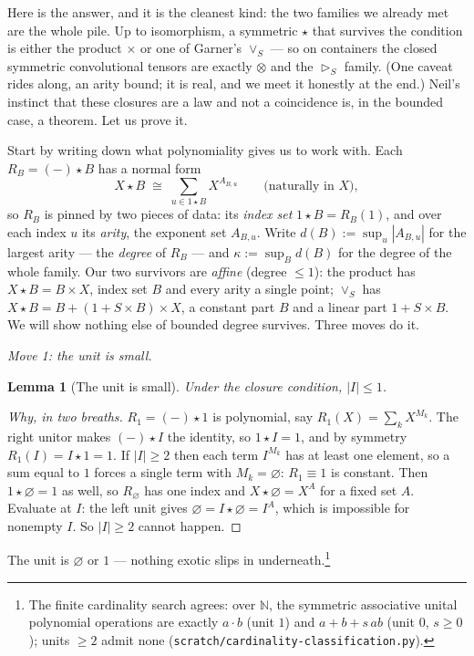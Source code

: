 \documentclass[11pt,a4paper]{book}
\theoremstyle{plain}
\newtheorem{Lemma}[Theorem]{Lemma}
\theoremstyle{definition}
\theoremstyle{remark}
\begin{document}
Here is the answer, and it is the cleanest kind: the two families we already met are
the whole pile. Up to isomorphism, a symmetric $\star$ that survives the condition is
either the product $\times$ or one of Garner's $\vee_S$ --- so on containers the
closed symmetric convolutional tensors are exactly $\otimes$ and the $\rhd_S$ family.
(One caveat rides along, an arity bound; it is real, and we meet it honestly at the
end.) Neil's instinct that these closures are a law and not a coincidence is, in the
bounded case, a theorem. Let us prove it.

Start by writing down what polynomiality gives us to work with. Each $R_B=(-)\star B$
has a normal form
\[
   X\star B\;\cong\;\sum_{u\in 1\star B} X^{A_{B,u}}\qquad\text{(naturally in $X$)},
\]
so $R_B$ is pinned by two pieces of data: its \emph{index set} $1\star B=R_B(1)$, and
over each index $u$ its \emph{arity}, the exponent set $A_{B,u}$. Write
$d(B):=\sup_u|A_{B,u}|$ for the largest arity --- the \emph{degree} of $R_B$ --- and
$\kappa:=\sup_B d(B)$ for the degree of the whole family. Our two survivors are
\emph{affine} (degree $\le 1$): the product has $X\star B=B\times X$, index set $B$
and every arity a single point; $\vee_S$ has $X\star B=B+(1+S\times B)\times X$, a
constant part $B$ and a linear part $1+S\times B$. We will show nothing else of
bounded degree survives. Three moves do it.

\medskip\noindent\emph{Move 1: the unit is small.}

\begin{Lemma}[The unit is small]\label{lem:unitsmall}
Under the closure condition, $|I|\le 1$.
\end{Lemma}

\begin{proof}[Why, in two breaths]
$R_1=(-)\star 1$ is polynomial, say $R_1(X)=\sum_k X^{M_k}$. The right unitor makes
$(-)\star I$ the identity, so $1\star I=1$, and by symmetry $R_1(I)=I\star 1=1$. If
$|I|\ge 2$ then each term $I^{M_k}$ has at least one element, so a sum equal to $1$
forces a single term with $M_k=\varnothing$: $R_1\equiv 1$ is constant. Then
$1\star\varnothing=1$ as well, so $R_\varnothing$ has one index and
$X\star\varnothing=X^A$ for a fixed set $A$. Evaluate at $I$: the left unit gives
$\varnothing=I\star\varnothing=I^A$, which is impossible for nonempty $I$. So
$|I|\ge 2$ cannot happen. \end{proof}

The unit is $\varnothing$ or $1$ --- nothing exotic slips in underneath.\footnote{The
finite cardinality search agrees: over $\mathbb N$, the symmetric associative unital
polynomial operations are exactly $a\cdot b$ (unit $1$) and $a+b+s\,ab$ (unit $0$,
$s\ge 0$); units $\ge 2$ admit none
(\texttt{scratch/cardinality-classification.py}).}
\end{document}

